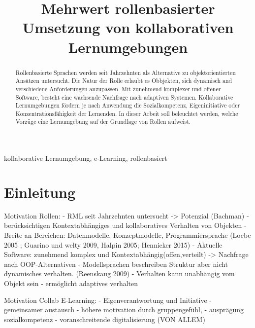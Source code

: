 \documentclass[conference]{IEEEtran}
\begin{document}
\title{Mehrwert rollenbasierter Umsetzung von kollaborativen Lernumgebungen\\}


\author{
}



\maketitle

\begin{abstract} Rollenbasierte Sprachen werden seit Jahrzehnten als Alternative zu objektorientierten Ansätzen untersucht. Die Natur der Rolle erlaubt es Obbjekten, sich dynamisch and verschiedene Anforderungen anzupassen. Mit zunehmend komplexer und offener Software, besteht eine wachsende Nachfrage nach adaptiven Systemen. Kollaborative Lernumgebungen fördern je nach Anwendung die Sozialkompetenz, Eigeninitiative oder Konzentrationsfähigkeit der Lernenden. In dieser Arbeit soll beleuchtet werden, welche Vorzüge eine Lernumgebung auf der Grundlage von Rollen aufweist.
\end{abstract}

\begin{IEEEkeywords}
kollaborative Lernumgebung, e-Learning, rollenbasiert
\end{IEEEkeywords}

\section{Einleitung}
Motivation Rollen:
- RML seit Jahrzehnten untersucht -> Potenzial (Bachman) \cite{family}
- berücksichtigen Kontextabhängiges und kollaboratives Verhalten von Objekten
- Breite an Bereichen: Datenmodelle, Konzeptmodelle, Programmiersprache (Loebe 2005 ; Guarino und welty 2009, Halpin 2005; Hennicker 2015)
- Aktuelle Software: zunehmend komplex und Kontextabhängig(offen,verteilt) -> Nachfrage nach OOP-Alternativen
- Modellsprachen beschreiben Struktur aber nicht dynamisches verhalten. (Reenskaug 2009)
- Verhalten kann unabhängig vom Objekt sein
- ermöglicht adaptives verhalten

Motivation  Collab E-Learning:
- Eigenverantwortung und Initiative
- gemeinsamer austausch
- höhere motivation durch gruppengefühl, 
- ausprägung sozialkompetenz
- voranschreitende digitalisierung (VON ALLEM) 
\end{document}
